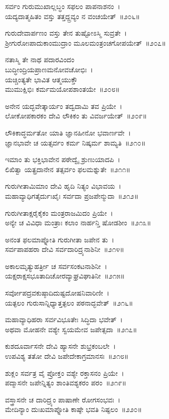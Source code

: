 ಸರ್ವಂ ಗುರುಮುಖಾಲ್ಲಬ್ಧಂ ಸಫಲಂ ಪಾಪನಾಶನಂ~।\\
ಯದ್ಯದಾತ್ಮಹಿತಂ ವಸ್ತು ತತ್ತದ್ದ್ರವ್ಯಂ ನ ವಂಚಯೇತ್~॥೨೦೬॥

ಗುರುದೇವಾರ್ಪಣಂ ವಸ್ತು ತೇನ ತುಷ್ಟೋಽಸ್ಮಿ ಸುವ್ರತೇ~।\\
ಶ್ರೀಗುರೋಃಪಾದುಕಾಂಮುದ್ರಾಂ ಮೂಲಮಂತ್ರಂಚಗೋಪಯೇತ್~॥೨೦೭॥

ನತಾಸ್ಮಿ ತೇ ನಾಥ ಪದಾರವಿಂದಂ\\ ಬುದ್ಧೀಂದ್ರಿಯಪ್ರಾಣಮನೋವಚೋಭಿಃ~।\\
ಯಚ್ಚಿಂತ್ಯತೇ ಭಾವಿತ ಆತ್ಮಯುಕ್ತೌ\\ ಮುಮುಕ್ಷಿಭಿಃ ಕರ್ಮಮಯೋಪಶಾಂತಯೇ~॥೨೦೮॥

ಅನೇನ ಯದ್ಭವೇತ್ಕಾರ್ಯಂ ತದ್ವದಾಮಿ ತವ ಪ್ರಿಯೇ~।\\
ಲೋಕೋಪಕಾರಕಂ ದೇವಿ ಲೌಕಿಕಂ ತು ವಿವರ್ಜಯೇತ್~॥೨೦೯॥

ಲೌಕಿಕಾದ್ಧರ್ಮತೋ ಯಾತಿ ಜ್ಞಾನಹೀನೋ ಭವಾರ್ಣವೇ~।\\
ಜ್ಞಾನಭಾವೇ ಚ ಯತ್ಸರ್ವಂ ಕರ್ಮ ನಿಷ್ಕರ್ಮ ಶಾಮ್ಯತಿ~॥೨೧೦॥

ಇಮಾಂ ತು ಭಕ್ತಿಭಾವೇನ ಪಠೇದ್ವೈ ಶ್ರುಣುಯಾದಪಿ~।\\
ಲಿಖಿತ್ವಾ ಯತ್ಪ್ರದಾನೇನ ತತ್ಸರ್ವಂ ಫಲಮಶ್ನುತೇ~॥೨೧೧॥

ಗುರುಗೀತಾಮಿಮಾಂ ದೇವಿ ಹೃದಿ ನಿತ್ಯಂ ವಿಭಾವಯ~।\\
ಮಹಾವ್ಯಾಧಿಗತೈರ್ದುಃಖೈಃ ಸರ್ವದಾ ಪ್ರಜಪೇನ್ಮುದಾ~॥೨೧೨॥

ಗುರುಗೀತಾಕ್ಷರೈಕೈಕಂ ಮಂತ್ರರಾಜಮಿದಂ ಪ್ರಿಯೇ~।\\
ಅನ್ಯೇ ಚ ವಿವಿಧಾ ಮಂತ್ರಾಃ ಕಲಾಂ ನಾರ್ಹನ್ತಿ ಷೋಡಶೀಂ~॥೨೧೩॥

ಅನಂತ ಫಲಮಾಪ್ನೋತಿ ಗುರುಗೀತಾ ಜಪೇನ ತು~।\\
ಸರ್ವಪಾಪಹರಾ ದೇವಿ ಸರ್ವದಾರಿದ್ರ್ಯನಾಶಿನೀ~॥೨೧೪॥

ಅಕಾಲಮೃತ್ಯುಹರ್ತ್ರೀ ಚ ಸರ್ವಸಂಕಟನಾಶಿನೀ~।\\
ಯಕ್ಷರಾಕ್ಷಸಭೂತಾದಿಚೋರವ್ಯಾಘ್ರವಿಘಾತಿನೀ~॥೨೧೫॥

ಸರ್ವೋಪದ್ರವಕುಷ್ಠಾದಿದುಷ್ಟದೋಷನಿವಾರಿಣೀ~।\\
ಯತ್ಫಲಂ ಗುರುಸಾನ್ನಿಧ್ಯಾತ್ತತ್ಫಲಂ ಪಠನಾದ್ಭವೇತ್~॥೨೧೬॥

ಮಹಾವ್ಯಾಧಿಹರಾ ಸರ್ವವಿಭೂತೇಃ ಸಿದ್ಧಿದಾ ಭವೇತ್~।\\
ಅಥವಾ ಮೋಹನೇ ವಶ್ಯೇ ಸ್ವಯಮೇವ ಜಪೇತ್ಸದಾ~॥೨೧೭॥

ಕುಶದೂರ್ವಾಸನೇ ದೇವಿ ಹ್ಯಾಸನೇ ಶುಭ್ರಕಂಬಲೇ~।\\
ಉಪವಿಶ್ಯ ತತೋ ದೇವಿ ಜಪೇದೇಕಾಗ್ರಮಾನಸಃ~॥೨೧೮॥

ಶುಕ್ಲಂ ಸರ್ವತ್ರ ವೈ ಪ್ರೋಕ್ತಂ ವಶ್ಯೇ ರಕ್ತಾಸನಂ ಪ್ರಿಯೇ~।\\
ಪದ್ಮಾಸನೇ ಜಪೇನ್ನಿತ್ಯಂ ಶಾಂತಿವಶ್ಯಕರಂ ಪರಂ~॥೨೧೯॥

ವಸ್ತ್ರಾಸನೇ ಚ ದಾರಿದ್ರ್ಯಂ ಪಾಷಾಣೇ ರೋಗಸಂಭವಃ~।\\
ಮೇದಿನ್ಯಾಂ ದುಃಖಮಾಪ್ನೋತಿ ಕಾಷ್ಠೇ ಭವತಿ ನಿಷ್ಫಲಂ~॥೨೨೦॥

